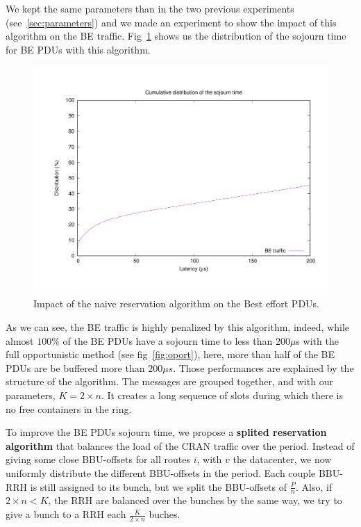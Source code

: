 \documentclass[]{algotel}
\begin{document}
We kept the same parameters than in the two previous experiments (see~\ref{sec:parameters}) and we made an experiment to show the impact of this algorithm on the BE traffic. Fig~\ref{fig:res1} shows us the distribution of the sojourn time for BE PDUs with this algorithm.

      \begin{figure}[h]
\centering
      \includegraphics[scale=0.4]{res1.pdf}
     \caption{Impact of the naive reservation algorithm on the Best effort PDUs.}   \label{fig:res1}
  \end{figure}

As we can see, the BE traffic is highly penalized by this algorithm, indeed, while almost $100\%$ of the BE PDUs have a sojourn time to less than $200 \mu$s with the full opportunistic method (see fig~\ref{fig:oport}), here, more than half of the BE PDUs are be buffered more than $200\mu s$. Those performances are explained by the structure of the algorithm. The messages are grouped together, and with our parameters, $K = 2\times n$. It creates a long sequence of slots during which there is no free containers in the ring. 

To improve the BE PDUs sojourn time, we propose a {\bf splited reservation algorithm} that balances the load of the CRAN traffic over the period. Instead of giving some close BBU-offsets for all routes $i$, with $v$ the datacenter, we now uniformly distribute the different BBU-offsets in the period. Each couple BBU-RRH is still assigned to its bunch, but we split the BBU-offsets of $\frac{P}{n}$. Also, if $2 \times n < K$, the RRH are balanced over the bunches by the same way, we try to give a bunch to a RRH each $\frac{K}{2\times n}$ buches.
\end{document}
